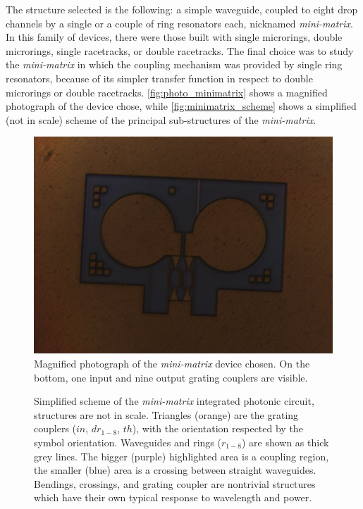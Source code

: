 The structure selected is the following: a simple waveguide, coupled to eight drop channels by a single or a couple of ring resonators each, nicknamed \textit{mini-matrix}.
In this family of devices, there were those built with single microrings, double microrings, single racetracks, or double racetracks.
The final choice was to study the \textit{mini-matrix} in which the coupling mechanism was provided by single ring resonators, because of its simpler transfer function in respect to double microrings or double racetracks.
\autoref{fig:photo_minimatrix} shows a magnified photograph of the device chose, while \autoref{fig:minimatrix_scheme} shows a simplified (not in scale) scheme of the principal sub-structures of the \textit{mini-matrix}.

\begin{figure}[htbp]
	\centering
	\includegraphics[scale=50]{figures/2017_10_31_foto_contatti_ring.jpg}
	\caption{Magnified photograph of the \textit{mini-matrix} device chosen. On the bottom, one input and nine output grating couplers are visible. }
	\label{fig:photo_minimatrix}
\end{figure}

\begin{figure}[hbtp]
	\centering
	
	\caption{
		Simplified scheme of the \textit{mini-matrix} integrated photonic circuit, structures are not in scale.
		Triangles (orange) are the grating couplers ($in$, $dr_{1-8}$, $th$), with the orientation respected by the symbol orientation.
		Waveguides and rings ($r_{1-8}$) are shown as thick grey lines.
		The bigger (purple) highlighted area is a coupling region, the smaller (blue) area is a crossing between straight waveguides.
		Bendings, crossings, and grating coupler are nontrivial structures which have their own typical response to wavelength and power.
	}
	\label{fig:minimatrix_scheme}
\end{figure}

